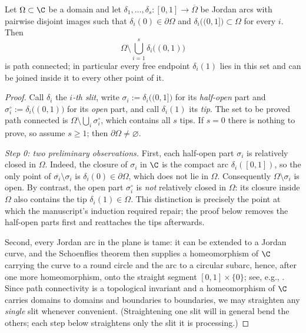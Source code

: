\begin{lemma}\label{lem:slits}
Let $\Omega\subset\C$ be a domain and let
$\delta_1,\dots,\delta_s\colon[0,1]\to\overline{\Omega}$ be Jordan arcs with pairwise
disjoint images such that $\delta_i(0)\in\partial\Omega$ and
$\delta_i\bigl((0,1]\bigr)\subset\Omega$ for every $i$. Then
\[
\Omega\setminus\bigcup_{i=1}^{s}\delta_i\bigl((0,1)\bigr)
\]
is path connected; in particular every free endpoint $\delta_i(1)$ lies in this set and
can be joined inside it to every other point of it.
\end{lemma}

\begin{proof}
Call $\delta_i$ the \emph{$i$-th slit}, write
$\sigma_i:=\delta_i\bigl((0,1]\bigr)$ for its \emph{half-open} part and
$\sigma_i^{\circ}:=\delta_i\bigl((0,1)\bigr)$ for its \emph{open} part, and call
$\delta_i(1)$ its \emph{tip}. The set to be proved path connected is
$\Omega\setminus\bigcup_i\sigma_i^{\circ}$, which contains all $s$ tips. If $s=0$ there
is nothing to prove, so assume $s\ge1$; then $\partial\Omega\neq\varnothing$.

\emph{Step 0: two preliminary observations.}
First, each half-open part $\sigma_i$ is relatively closed in $\Omega$. Indeed, the
closure of $\sigma_i$ in $\C$ is the compact arc $\delta_i([0,1])$, so the only point of
$\overline{\sigma_i}\setminus\sigma_i$ is $\delta_i(0)\in\partial\Omega$, which does not
lie in $\Omega$. Consequently $\Omega\setminus\sigma_i$ is open. By contrast, the open
part $\sigma_i^{\circ}$ is \emph{not} relatively closed in $\Omega$: its closure inside
$\Omega$ also contains the tip $\delta_i(1)\in\Omega$. This distinction is precisely the
point at which the manuscript's induction required repair; the proof below removes the
half-open parts first and reattaches the tips afterwards.

Second, every Jordan arc in the plane is tame: it can be extended to a Jordan curve,
and the Schoenflies theorem then supplies a homeomorphism of $\C$ carrying the curve to
a round circle and the arc to a circular subarc, hence, after one more homeomorphism,
onto the straight segment $[0,1]\times\{0\}$; see, e.g.,
\cite{New51,Why42}. Since path connectivity is a topological invariant and a
homeomorphism of $\C$ carries domains to domains and boundaries to boundaries, we may
straighten any \emph{single} slit whenever convenient. (Straightening one slit will in
general bend the others; each step below straightens only the slit it is processing.)


\end{proof}
